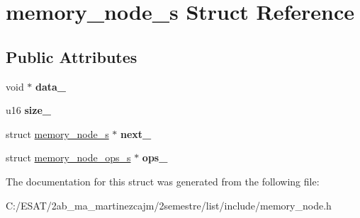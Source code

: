\hypertarget{structmemory__node__s}{}\section{memory\+\_\+node\+\_\+s Struct Reference}
\label{structmemory__node__s}
\subsection*{Public Attributes}
\begin{DoxyCompactItemize}
\item 
\mbox{\label{structmemory__node__s_ae5c51b455c45732951edc8b5f9e205cf}} 
void $\ast$ {\bfseries data\+\_\+}
\item 
\mbox{\label{structmemory__node__s_aa8fbd1b47457157824d0e4bbb99f2721}} 
u16 {\bfseries size\+\_\+}
\item 
\mbox{\label{structmemory__node__s_a56e5430d28054fb5a0281bf3bc409acf}} 
struct \hyperlink{structmemory__node__s}{memory\+\_\+node\+\_\+s} $\ast$ {\bfseries next\+\_\+}
\item 
\mbox{\label{structmemory__node__s_a14e02a1ffddcb770d92d4a58658e35b9}} 
struct \hyperlink{structmemory__node__ops__s}{memory\+\_\+node\+\_\+ops\+\_\+s} $\ast$ {\bfseries ops\+\_\+}
\end{DoxyCompactItemize}


The documentation for this struct was generated from the following file\+:\begin{DoxyCompactItemize}
\item 
C\+:/\+E\+S\+A\+T/2ab\+\_\+ma\+\_\+martinezcajm/2semestre/list/include/memory\+\_\+node.\+h\end{DoxyCompactItemize}
